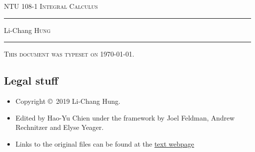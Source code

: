 \documentclass[12pt,letterpaper, openany]{book}
\begin{document}
\setcounter{page}{0}

\begin{titlepage}
\begin{center}
\textsc{\LARGE NTU 108-1 Integral Calculus
}\\[2ex]

\vspace{5ex}
\hrule
\vspace{5ex}

\large Li-Chang \textsc{Hung}
\end{center}
\vspace{2ex}
\hrule

\vfill
\textsc{This document was typeset on \today.}
\end{titlepage}

\subsection*{Legal stuff}
\begin{itemize}
\item Copyright \copyright\ 2019 Li-Chang Hung.

\item Edited by Hao-Yu Chien under the framework by Joel Feldman, Andrew Rechnitzer and Elyse Yeager. 

\item Links to the original files can be found at the \href{http://www.math.ubc.ca/~CLP/index.html}{text webpage}
\end{itemize}

\frontmatter


\tableofcontents

\mainmatter





%
%
%
\end{document}
